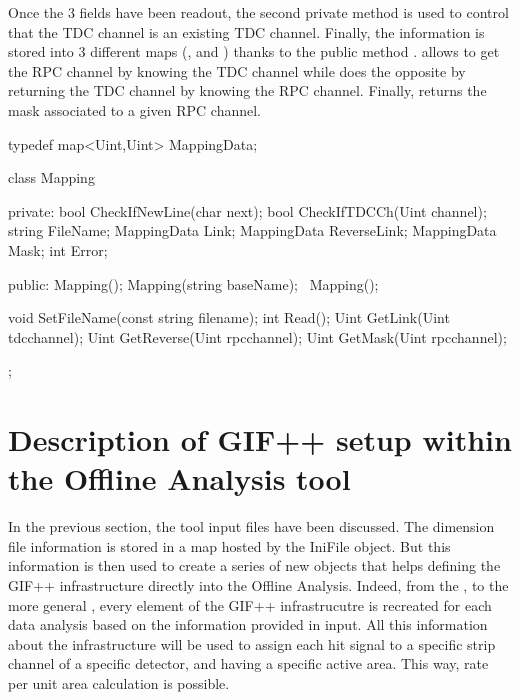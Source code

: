 	Once the 3 fields have been readout, the second private method  is used to control that the TDC channel is an existing TDC channel. Finally, the information is stored into 3 different maps (,  and ) thanks to the public method .  allows to get the RPC channel by knowing the TDC channel while  does the opposite by returning the TDC channel by knowing the RPC channel. Finally,  returns the mask associated to a given RPC channel.\\
	
	\begin{code}
	\begin{cppcode}
typedef map<Uint,Uint> MappingData;

class Mapping {
    private:
        bool        CheckIfNewLine(char next);
        bool        CheckIfTDCCh(Uint channel);
        string      FileName;
        MappingData Link;
        MappingData ReverseLink;
        MappingData Mask;
        int         Error;

    public:
        Mapping();
        Mapping(string baseName);
        ~Mapping();

        void SetFileName(const string filename);
        int Read();
        Uint GetLink(Uint tdcchannel);
        Uint GetReverse(Uint rpcchannel);
        Uint GetMask(Uint rpcchannel);
};
	\end{cppcode}
	\label{cpp:mapping}
	\vspace{5mm}
	\end{code}
	
\section{Description of GIF++ setup within the Offline Analysis tool}
\label{app2:sec:GIFsetup}

	In the previous section, the tool input files have been discussed. The dimension file information is stored in a map hosted by the IniFile object. But this information is then used to create a series of new objects that helps defining the GIF++ infrastructure directly into the Offline Analysis. Indeed, from the , to the more general , every element of the GIF++ infrastrucutre is recreated for each data analysis based on the information provided in input. All this information about the infrastructure will be used to assign each hit signal to a specific strip channel of a specific detector, and having a specific active area. This way, rate per unit area calculation is possible.\\
	
